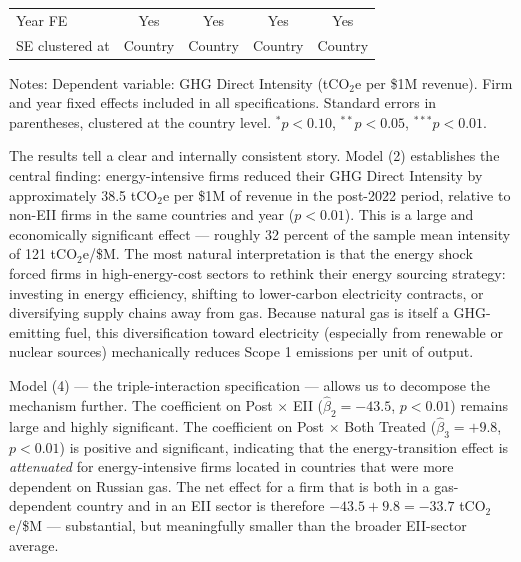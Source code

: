 \documentclass[12pt,a4paper]{article}
\begin{document}
\begin{table}[H]
\begin{tabular}{lcccc}
Year FE        & Yes     & Yes     & Yes     & Yes \\
SE clustered at & Country & Country & Country & Country \\
\bottomrule
\end{tabular}
\begin{tablenotes}
\small
\item Notes: Dependent variable: GHG Direct Intensity (tCO$_2$e per \$1M revenue). Firm and year fixed effects included in all specifications. Standard errors in parentheses, clustered at the country level. $^{*}p<0.10$, $^{**}p<0.05$, $^{***}p<0.01$.
\end{tablenotes}
\end{table}

The results tell a clear and internally consistent story. Model (2) establishes the central finding: energy-intensive firms reduced their GHG Direct Intensity by approximately 38.5 tCO$_2$e per \$1M of revenue in the post-2022 period, relative to non-EII firms in the same countries and year ($p < 0.01$). This is a large and economically significant effect — roughly 32 percent of the sample mean intensity of 121 tCO$_2$e/\$M. The most natural interpretation is that the energy shock forced firms in high-energy-cost sectors to rethink their energy sourcing strategy: investing in energy efficiency, shifting to lower-carbon electricity contracts, or diversifying supply chains away from gas. Because natural gas is itself a GHG-emitting fuel, this diversification toward electricity (especially from renewable or nuclear sources) mechanically reduces Scope 1 emissions per unit of output.

Model (4) — the triple-interaction specification — allows us to decompose the mechanism further. The coefficient on Post $\times$ EII ($\hat\beta_2 = -43.5$, $p<0.01$) remains large and highly significant. The coefficient on Post $\times$ Both Treated ($\hat\beta_3 = +9.8$, $p<0.01$) is positive and significant, indicating that the energy-transition effect is \textit{attenuated} for energy-intensive firms located in countries that were more dependent on Russian gas. The net effect for a firm that is both in a gas-dependent country and in an EII sector is therefore $-43.5 + 9.8 = -33.7$ tCO$_2$e/\$M — substantial, but meaningfully smaller than the broader EII-sector average.
\end{document}
